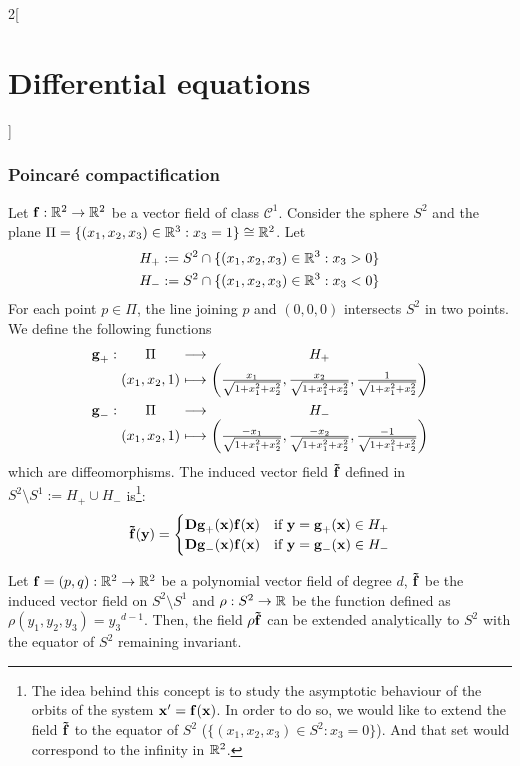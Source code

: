 \documentclass[../../../main_math.tex]{subfiles}
\begin{document}
\begin{multicols}{2}[\section{Differential equations}]
  \subsubsection{Poincaré compactification}
  \begin{definition}
    Let $\boldsymbol{\mathrm{f}}:\mathbb{R}^2\rightarrow\mathbb{R}^2$ be a vector field of class $\mathcal{C}^1$. Consider the sphere $S^2$ and the plane $\Pi=\{(x_1,x_2,x_3)\in\mathbb{R}^3:x_3=1\}\cong\mathbb{R}^2$. Let
    \begin{gather*}
      H_+:=S^2\cap\{(x_1,x_2,x_3)\in\mathbb{R}^3:x_3>0\}\\
      H_-:=S^2\cap\{(x_1,x_2,x_3)\in\mathbb{R}^3:x_3<0\}
    \end{gather*}
    For each point $p\in\Pi$, the line joining $p$ and $(0,0,0)$ intersects $S^2$ in two points. We define the following functions
    \begin{gather*}
      \function{\vf{g}_+}{\Pi}{H_+}{(x_1,x_2,1)}{\left(\frac{x_1}{\sqrt{1+x_1^2+x_2^2}},\frac{x_2}{\sqrt{1+x_1^2+x_2^2}},\frac{1}{\sqrt{1+x_1^2+x_2^2}}\right)}\\
      \function{\vf{g}_-}{\Pi}{H_-}{(x_1,x_2,1)}{\left(\frac{-x_1}{\sqrt{1+x_1^2+x_2^2}},\frac{-x_2}{\sqrt{1+x_1^2+x_2^2}},\frac{-1}{\sqrt{1+x_1^2+x_2^2}}\right)}
    \end{gather*}
    which are diffeomorphisms. The induced vector field $\boldsymbol{\mathrm{\tilde{f}}}$ defined in $S^2\setminus S^1:=H_+\cup H_-$ is\footnote{The idea behind this concept is to study the asymptotic behaviour of the orbits of the system $\boldsymbol{\mathrm{x}}'=\boldsymbol{\mathrm{f}}(\boldsymbol{\mathrm{x}})$. In order to do so, we would like to extend the field $\boldsymbol{\mathrm{\tilde{f}}}$ to the equator of $S^2$ ($\{(x_1,x_2,x_3)\in S^2:x_3=0\}$). And that set would correspond to the infinity in $\mathbb{R}^2$.}:
    $$\boldsymbol{\mathrm{\tilde{f}}}(\boldsymbol{\mathrm{y}})=
      \begin{cases}
        \boldsymbol{\mathrm{D}}\boldsymbol{\mathrm{g}}_+(\boldsymbol{\mathrm{x}}) \boldsymbol{\mathrm{f}}(\boldsymbol{\mathrm{x}}) & \text{if }\boldsymbol{\mathrm{y}}=\boldsymbol{\mathrm{g}}_+(\boldsymbol{\mathrm{x}})\in H_+ \\
        \boldsymbol{\mathrm{D}}\boldsymbol{\mathrm{g}}_-(\boldsymbol{\mathrm{x}}) \boldsymbol{\mathrm{f}}(\boldsymbol{\mathrm{x}}) & \text{if }\boldsymbol{\mathrm{y}}=\boldsymbol{\mathrm{g}}_-(\boldsymbol{\mathrm{x}})\in H_-
      \end{cases}
    $$
  \end{definition}
  \begin{proposition}
    Let $\boldsymbol{\mathrm{f}}=(p,q):\mathbb{R}^2\rightarrow\mathbb{R}^2$ be a polynomial vector field of degree $d$, $\boldsymbol{\mathrm{\tilde{f}}}$ be the induced vector field on $S^2\setminus S^1$ and $\rho:S^2\rightarrow\mathbb{R}$ be the function defined as $\rho(y_1,y_2,y_3)={y_3}^{d-1}$. Then, the field $\rho\boldsymbol{\mathrm{\tilde{f}}}$ can be extended analytically to $S^2$ with the equator of $S^2$ remaining invariant.

\end{proposition}
\end{multicols}
\end{document}
